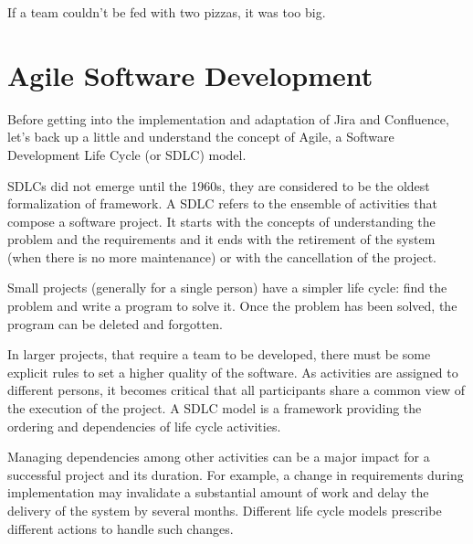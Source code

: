 \begin{savequote}[75mm]
If a team couldn’t be fed with two pizzas, it was too big.
\end{savequote}


\chapter{Agile Software Development}

Before getting into the implementation and adaptation of Jira and Confluence, let's back up a little and understand the concept of Agile, a Software Development Life Cycle (or SDLC) model.

SDLCs did not emerge until the 1960s, they are considered to be the oldest formalization of framework.
A SDLC refers to the ensemble of activities that compose a software project.
It starts with the concepts of understanding the problem and the requirements and it ends with the retirement of the system (when there is no more maintenance) or with the cancellation of the project.

Small projects (generally for a single person) have a simpler life cycle: find the problem and write a program to solve it.
Once the problem has been solved, the program can be deleted and forgotten.

In larger projects, that require a team to be developed, there must be some explicit rules to set a higher quality of the software.
As activities are assigned to different persons, it becomes critical that all participants share a common view of the execution of the project.
A SDLC model is a framework providing the ordering and dependencies of life cycle activities. 

Managing dependencies among other activities can be a major impact for a successful project and its duration. 
For example, a change in requirements during implementation may invalidate a substantial amount of work and delay the delivery of the system by several months.
Different life cycle models prescribe different actions to handle such changes.

